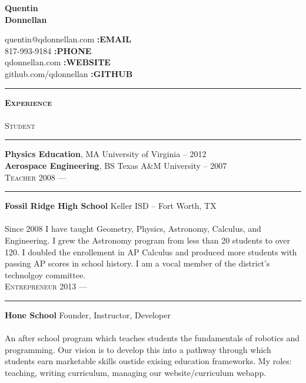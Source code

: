 \documentclass{article}
\begin{document}
\begin{multicols}{2}

{\bfseries
	{\Huge Quentin } \\
	{\Huge Donnellan }
}
\columnbreak


{\raggedleft
	quentin@qdonnellan.com {\bf :EMAIL}\\
	817-993-9184 {\bf :PHONE}\\
	qdonnellan.com {\bf :WEBSITE}\\
	github.com/qdonnellan {\bf :GITHUB}\\
}

\end{multicols}
\begin{center}
\rule{\textwidth}{8pt}
\end{center}

\begin{multicols}{2}

\textsc{\bfseries \Large Experience} \\
\\
\textsc{\large Student }
\vspace{4pt} \hrule \vspace{4pt}

{\bfseries Physics Education}, MA \hfill University of Virginia -- 2012 \\
{\bfseries Aerospace Engineering}, BS \hfill Texas A\&M University -- 2007\\

\vspace{8pt}
\textsc{\large Teacher \hfill 2008 --- }
\vspace{4pt} \hrule \vspace{4pt}
{\bfseries Fossil Ridge High School} \hfill Keller ISD -- Fort Worth, TX \\
\\
Since 2008 I have taught Geometry, Physics, Astronomy, Calculus, and Engineering. I grew the Astronomy program from less than 20 students to over 120. I doubled the enrollement in AP Calculus and produced more students with passing AP scores in school history. I am a vocal member of the district's technolgoy committee. \\

\vspace{8pt}
\textsc{\large Entrepreneur \hfill 2013 --- }
\vspace{4pt} \hrule \vspace{4pt}
{\bfseries Hone School} \hfill Founder, Instructor, Developer\\
\\
An after school program which teaches students the fundamentals of robotics and programming. Our vision is to develop this into a pathway through which students earn marketable skills oustide exising education frameworks. My roles: teaching, writing curriculum, managing our website/curriculum webapp. 


\end{multicols}
\end{document}
